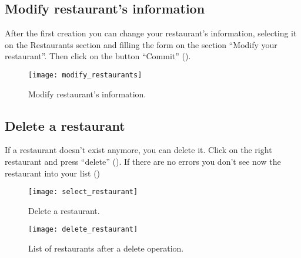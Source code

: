 \subsection{Modify restaurant's information}

After the first creation you can change your restaurant’s information, selecting
it on the Restaurants section and filling the
form on the section ``Modify your restaurant''. Then click on the button
``Commit'' ().

\begin{figure}[H]
	\texttt{[image: modify\_restaurants]}
	\caption{Modify restaurant's information.}\label{fig:modify_restaurants}
\end{figure}

\subsection{Delete a restaurant}

If a restaurant doesn't exist anymore, you can delete it. Click on the right
restaurant and press ``delete'' (). If there are
no errors you don't see now the restaurant into your list
()

\begin{figure}[H]
	\texttt{[image: select\_restaurant]}
	\caption{Delete a restaurant.}\label{fig:select_restaurant}
\end{figure}

\begin{figure}[H]
	\texttt{[image: delete\_restaurant]}
	\caption{List of restaurants after a delete operation.}\label{fig:delete_restaurant}
\end{figure}
